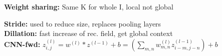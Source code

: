 \textbf{Weight sharing:} Same K for whole I, local not global\\

\textbf{Stride:} used to reduce size, replaces pooling layers\\
\textbf{Dillation:} fast increase of rec. field, get global context\\

\textbf{CNN-fwd:} $z_{i,j}^{(l)} = w^{(l)} * z^{(l-1)} + b = (\sum_{m,n} w_{m,n}^{(l)} z_{i-m, j-n}^{(l-1)}) + b$

